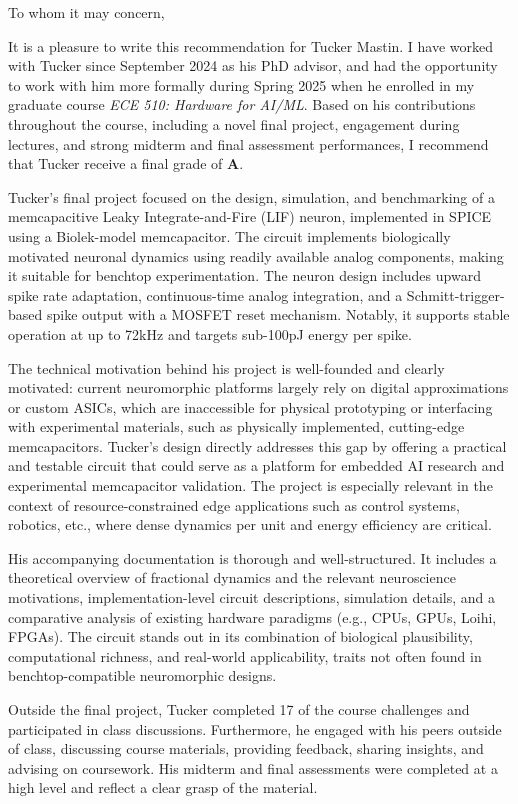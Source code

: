\documentclass[12pt]{letter}
\begin{document}
To whom it may concern,

It is a pleasure to write this recommendation for Tucker Mastin. I have worked with Tucker since September 2024 as his PhD advisor, and had the opportunity to work with him more formally during Spring 2025 when he enrolled in my graduate course \textit{ECE 510: Hardware for AI/ML}. Based on his contributions throughout the course, including a novel final project, engagement during lectures, and strong midterm and final assessment performances, I recommend that Tucker receive a final grade of \textbf{A}.

Tucker’s final project focused on the design, simulation, and benchmarking of a memcapacitive Leaky Integrate-and-Fire (LIF) neuron, implemented in SPICE using a Biolek-model memcapacitor. The circuit implements biologically motivated neuronal dynamics using readily available analog components, making it suitable for benchtop experimentation. The neuron design includes upward spike rate adaptation, continuous-time analog integration, and a Schmitt-trigger-based spike output with a MOSFET reset mechanism. Notably, it supports stable operation at up to 72kHz and targets sub-100pJ energy per spike.

The technical motivation behind his project is well-founded and clearly motivated: current neuromorphic platforms largely rely on digital approximations or custom ASICs, which are inaccessible for physical prototyping or interfacing with experimental materials, such as physically implemented, cutting-edge memcapacitors. Tucker’s design directly addresses this gap by offering a practical and testable circuit that could serve as a platform for embedded AI research and experimental memcapacitor validation. The project is especially relevant in the context of resource-constrained edge applications such as control systems, robotics, etc., where dense dynamics per unit and energy efficiency are critical.

His accompanying documentation is thorough and well-structured. It includes a theoretical overview of fractional dynamics and the relevant neuroscience motivations, implementation-level circuit descriptions, simulation details, and a comparative analysis of existing hardware paradigms (e.g., CPUs, GPUs, Loihi, FPGAs). The circuit stands out in its combination of biological plausibility, computational richness, and real-world applicability, traits not often found in benchtop-compatible neuromorphic designs.

Outside the final project, Tucker completed 17 of the course challenges and participated in class discussions. Furthermore, he engaged with his peers outside of class, discussing course materials, providing feedback, sharing insights, and advising on coursework. His midterm and final assessments were completed at a high level and reflect a clear grasp of the material. 
\end{document}

